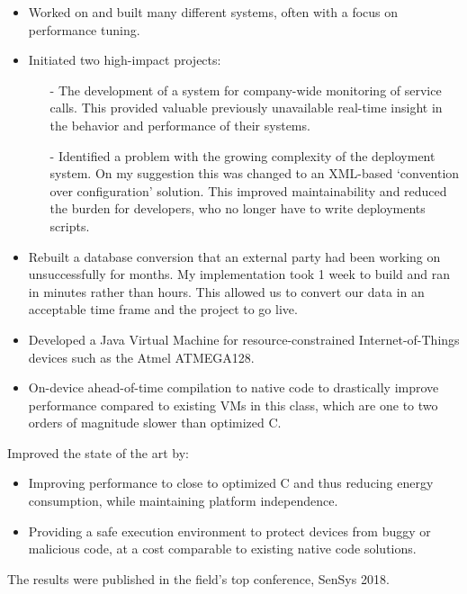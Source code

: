 \documentclass[10pt,a4paper]{../altacv}
\begin{document}
\medskip

\begin{itemize}
	\item Worked on and built many different systems, often with a focus on performance tuning.
	\item Initiated two high-impact projects:
	\begin{itemize}
		\item[-] The development of a system for company-wide monitoring of service calls. This provided valuable previously unavailable real-time insight in the behavior and performance of their systems.
		\item[-] Identified a problem with the growing complexity of the deployment system. On my suggestion this was changed to an XML-based ‘convention over configuration' solution. This improved maintainability and reduced the burden for developers, who no longer have to write deployments scripts.
	\end{itemize}
	\item Rebuilt a database conversion that an external party had been working on unsuccessfully for months. My implementation took 1 week to build and ran in minutes rather than hours. This allowed us to convert our data in an acceptable time frame and the project to go live.
\end{itemize}

\medskip\medskip{}

\begin{itemize}
	\item Developed a Java Virtual Machine for resource-constrained Internet-of-Things devices such as the Atmel ATMEGA128.
	\item On-device ahead-of-time compilation to native code to drastically improve performance compared to existing VMs in this class, which are one to two orders of magnitude slower than optimized C.
\end{itemize}

Improved the state of the art by:

\medskip

\begin{itemize}
	\item Improving performance to close to optimized C and thus reducing energy consumption, while maintaining platform independence.
	\item Providing a safe execution environment to protect devices from buggy or malicious code, at a cost comparable to existing native code solutions.
\end{itemize}

\medskip

The results were published in the field's top conference, SenSys 2018.

\medskip


\medskip
\end{document}

